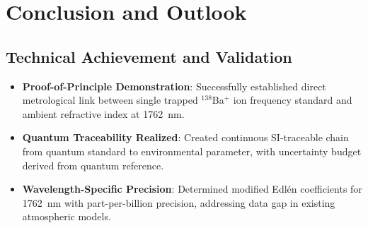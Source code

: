 \documentclass[aip,reprint,groupedaddress,onecolumn,superscriptaddress]{revtex4-2}
\begin{document}
\section{Conclusion and Outlook}

\subsection{Technical Achievement and Validation}
\begin{itemize}
    \item \textbf{Proof-of-Principle Demonstration}: Successfully established direct metrological link between single trapped $^{138}$Ba$^+$ ion frequency standard and ambient refractive index at \SI{1762}{\nano\meter}.
    
    \item \textbf{Quantum Traceability Realized}: Created continuous SI-traceable chain from quantum standard to environmental parameter, with uncertainty budget derived from quantum reference.
    
    \item \textbf{Wavelength-Specific Precision}: Determined modified Edlén coefficients for \SI{1762}{\nano\meter} with part-per-billion precision, addressing data gap in existing atmospheric models.
\end{itemize}
\end{document}
